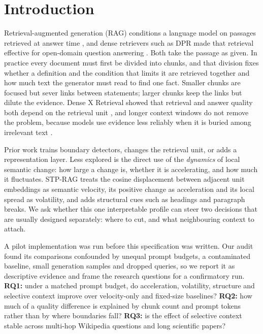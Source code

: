 \documentclass[conference,a4paper]{IEEEtran}
\begin{document}
\section{Introduction}
\label{sec:intro}

Retrieval-augmented generation (RAG) conditions a language model on passages retrieved at answer time \cite{lewis2020rag}, and dense retrievers such as DPR made that retrieval effective for open-domain question answering \cite{karpukhin2020dpr}. Both take the passage as given. In practice every document must first be divided into chunks, and that division fixes whether a definition and the condition that limits it are retrieved together and how much text the generator must read to find one fact. Smaller chunks are focused but sever links between statements; larger chunks keep the links but dilute the evidence. Dense X Retrieval showed that retrieval and answer quality both depend on the retrieval unit \cite{chen2024densex}, and longer context windows do not remove the problem, because models use evidence less reliably when it is buried among irrelevant text \cite{liu2024lostmiddle}.

Prior work trains boundary detectors, changes the retrieval unit, or adds a representation layer. Less explored is the direct use of the \emph{dynamics} of local semantic change: how large a change is, whether it is accelerating, and how much it fluctuates. STP-RAG treats the cosine displacement between adjacent unit embeddings as semantic velocity, its positive change as acceleration and its local spread as volatility, and adds structural cues such as headings and paragraph breaks. We ask whether this one interpretable profile can steer two decisions that are usually designed separately: where to cut, and what neighbouring context to attach.

A pilot implementation was run before this specification was written. Our audit found its comparisons confounded by unequal prompt budgets, a contaminated baseline, small generation samples and dropped queries, so we report it as descriptive evidence and frame the research questions for a confirmatory run. \textbf{RQ1:} under a matched prompt budget, do acceleration, volatility, structure and selective context improve over velocity-only and fixed-size baselines? \textbf{RQ2:} how much of a quality difference is explained by chunk count and prompt tokens rather than by where boundaries fall? \textbf{RQ3:} is the effect of selective context stable across multi-hop Wikipedia questions and long scientific papers?
\end{document}
